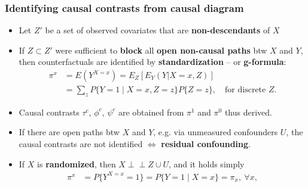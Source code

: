 \documentclass[12pt,dvipsnames,t,aspectratio=169, handout%
]{beamer}
\newcommand{\indep}{\perp\!\!\!\perp}
\begin{document}
\begin{frame}
\frametitle{\large Identifying causal contrasts from causal diagram}

\begin{itemize}
\item
Let $Z'$ be a set of observed covariates that are {\bf non-descendants} of $X$
\medskip
\item
If $Z\subset Z'$ were sufficient to {\bf block} all \textbf{open non-causal paths}
 btw $X$ and $Y$, then
counterfactuals are identified by {\bf standardization} -- or {\bf g-formula}:
\begin{align*}
 \pi^x & = E( Y^{X=x}) = E_Z[E_Y(Y|X=x, Z)] \\
   & = \sum_z P \{ Y=1 \mid X= x, Z=z \} P\{ Z=z\} , \quad\text{for discrete }Z.
\end{align*}
\item
Causal contrasts $\tau^c$, $\phi^c$, $\psi^c$	are obtained from  $\pi^1$
and $\pi^0$ thus derived. 
\medskip
\item 
If there are {open paths} btw $X$ and $Y$, e.g. via unmeasured confounders $U$, the causal
contrasts are not identified $\Leftrightarrow$ {\bf residual confounding}.
\medskip
\item
If $X$ is \textbf{randomized}, then  %
$X\indep Z\cup U$, 
and it holds simply %
\begin{align*}
\pi^x & = P \{ Y^{X=x} = 1 \} =  P \{ Y=1 \mid X= x \} = \pi_x, \ \forall x,  \\
\end{align*}
\end{itemize}	
\end{frame}
\end{document}
